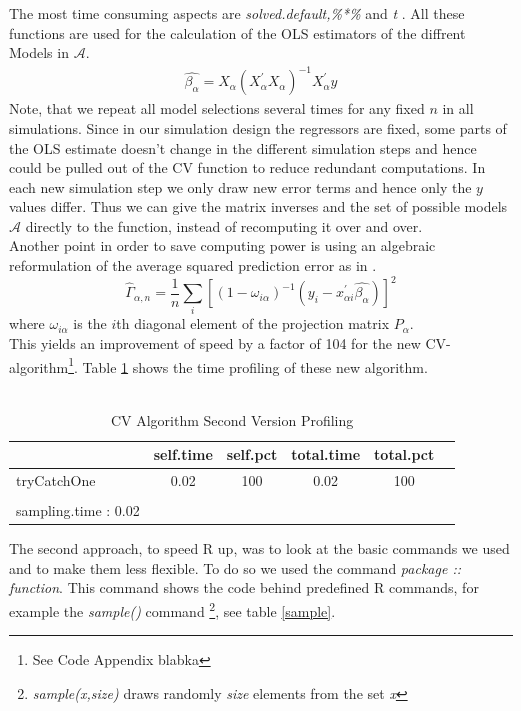 \documentclass[Research_Module_ES.tex]{subfiles}
\begin{document}
The most time consuming aspects are {\itshape solved.default,\%*\%} and {\itshape t} . All these functions are used for the calculation of the OLS estimators of the diffrent Models in $\mathcal{A}$.
\begin{align*}
\hat{\beta_\alpha}=X_\alpha(X^\prime_\alpha X_\alpha)^{-1}X_\alpha^\prime y
\end{align*}
Note, that we repeat all model selections several times for any fixed $n$ in all simulations. Since in our simulation design the regressors are fixed, some parts of the OLS estimate doesn't change in the different simulation steps and hence could be pulled out of the CV function to reduce redundant computations. In each new simulation step we only draw new error terms and hence only the $y$ values differ. Thus we can give the matrix inverses and the set of possible models $\mathcal{A}$ directly to the function, instead of recomputing it over and over.
\\
Another point in order to save computing power is using an algebraic reformulation of the average squared prediction error as in \cite{shao}.
\[
	\hat{\Gamma}_{\alpha,n}=\frac{1}{n}\sum_i[(1-\omega_{i\alpha})^{-1}(y_i-x^\prime_{\alpha i}\hat{\beta_\alpha})]^2
\]
where $\omega_{i\alpha}$ is the $i$th diagonal element of the projection matrix $P_\alpha$.\\
This yields an improvement of speed by a factor of 104 for the new CV-algorithm\footnote{See Code Appendix blabka}. Table \ref{CVneu} shows the time profiling of these new algorithm.\\
\\
\begin{table}[!h]
	\caption{CV Algorithm Second Version Profiling }
	\label{CVneu}
	\centering
	\begin{tabular}{lccccc}
		\toprule
		\midrule
		\textbf{\scriptsize }
		&\textbf{\scriptsize self.time}
		&\textbf{\scriptsize self.pct}
		&\textbf{\scriptsize total.time}
		&\textbf{\scriptsize total.pct}
		\\\midrule\midrule
		\scriptsize tryCatchOne & \scriptsize 0.02 & \scriptsize 100 &\scriptsize 0.02 & \scriptsize 100 \\
		\\
		\scriptsize sampling.time : 0.02
	\end{tabular}
\end{table}
The second approach, to speed R up,  was to look at the basic commands we used and to make them less flexible. To do so we used the command {\itshape package :: function}. This command shows the code behind predefined R commands, for example the {\itshape sample()} command \footnote{{\itshape sample(x,size)} draws randomly {\itshape size} elements from the set {\itshape x} }, see table \ref{sample}.
\end{document}
